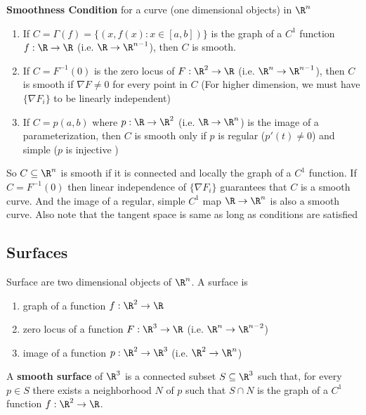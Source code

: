 \documentclass[11pt]{article}
\begin{document}
\begin{defn*}
  \textbf{Smoothness Condition} for a curve (one dimensional objects) in $\R^n$
  \begin{enumerate}
    \item If $C = \Gamma(f) = \{ (x, f(x): x\in [a,b] )\}$ is the graph of a \textbf{$C^1$} function $f: \R \to \R$ (i.e. $\R \to \R^{n-1}$), then $C$ is smooth.
    \item If $C = F^{-1}(0)$ is the zero locus of $F: \R^2 \to \R$ (i.e. $\R^n \to \R^{n-1}$), then $C$ is smooth if $\nabla F\neq 0$ for every point in $C$ (For higher dimension, we must have $\{ \nabla F_i \}$ to be linearly independent)
    \item If $C = p(a,b)$ where $p: \R \to \R^2$ (i.e. $\R \to \R^n$) is the image of a parameterization, then $C$ is smooth only if $p$ is regular ($p'(t) \neq 0$) and simple ($p$ is injective
    )
  \end{enumerate}
  \begin{rem}
    So $C\subseteq \R^n$ is smooth if it is connected and locally the graph of a $C^1$ function. If $C = F^{-1}(0)$ then linear independence of $\{ \nabla F_i \}$ guarantees that $C$ is a smooth curve. And the image of a regular, simple $C^1$ map $\R \to \R^n$ is also a smooth curve. Also note that the tangent space is same as long as conditions are satisfied
  \end{rem}
\end{defn*}


\subsection*{Surfaces}

\begin{defn*}
   Surface are two dimensional objects of $\R^n$. A surface is
   \begin{enumerate}
     \item graph of a function $f: \R^2 \to \R$
     \item zero locus of a function $F: \R^3 \to \R$  (i.e. $\R^n \to \R^{n-2}$)
     \item image of a function $p: \R^2 \to \R^3$  (i.e. $\R^2 \to \R^{n}$)
   \end{enumerate}
\end{defn*}


\begin{defn*}
  A \textbf{smooth surface} of $\R^3$ is a connected subset $S\subseteq \R^3$ such that, for every $p\in S$ there exists a neighborhood $N$ of $p$ such that $S\cap N$ is the graph of a $C^1$ function $f:\R^2 \to \R$.
\end{defn*}
\end{document}
